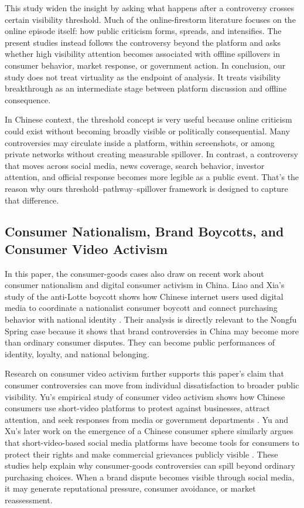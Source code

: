 \documentclass[conference]{IEEEtran}
\begin{document}
This study widen the insight by asking what happens after a controversy crosses certain visibility threshold. Much of the online-firestorm literature focuses on the online episode itself: how public criticism forms, spreads, and intensifies. The present studies instead follows the controversy beyond the platform and asks whether high visibility attention becomes associated with offline spillovers in consumer behavior, market response, or government action. In conclusion, our study does not treat virtuality as the endpoint of analysis. It treats visibility breakthrough as an intermediate stage between platform discussion and offline consequence.

In Chinese context, the threshold concept is very useful because online criticism could exist without becoming broadly visible or politically consequential. Many controversies may circulate inside a platform, within screenshots, or among private networks without creating measurable spillover. In contrast, a controversy that moves across social media, news coverage, search behavior, investor attention, and official response becomes more legible as a public event. That's the reason why ours threshold--pathway--spillover framework is designed to capture that difference.

\subsection{Consumer Nationalism, Brand Boycotts, and Consumer Video Activism}

In this paper, the consumer-goods cases also draw on recent work about consumer nationalism and digital consumer activism in China. Liao and Xia's study of the anti-Lotte boycott shows how Chinese internet users used digital media to coordinate a nationalist consumer boycott and connect purchasing behavior with national identity \cite{liao2023consumer}. Their analysis is directly relevant to the Nongfu Spring case because it shows that brand controversies in China may become more than ordinary consumer disputes. They can become public performances of identity, loyalty, and national belonging.

Research on consumer video activism further supports this paper's claim that consumer controversies can move from individual dissatisfaction to broader public visibility. Yu's empirical study of consumer video activism shows how Chinese consumers use short-video platforms to protest against businesses, attract attention, and seek responses from media or government departments \cite{yu2021video}. Yu and Xu's later work on the emergence of a Chinese consumer sphere similarly argues that short-video-based social media platforms have become tools for consumers to protect their rights and make commercial grievances publicly visible \cite{yu2023consumer}. These studies help explain why consumer-goods controversies can spill beyond ordinary purchasing choices. When a brand dispute becomes visible through social media, it may generate reputational pressure, consumer avoidance, or market reassessment.
\end{document}
